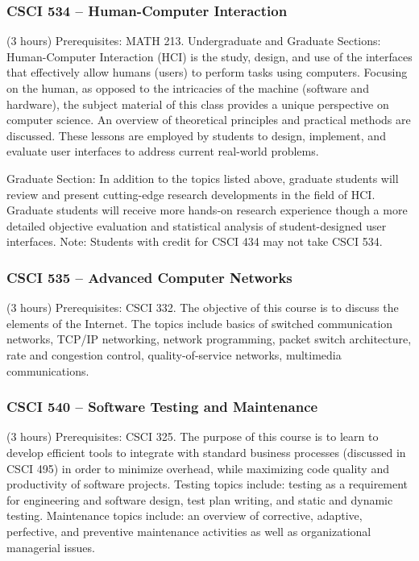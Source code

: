 \subsubsection{CSCI 534 -- Human-Computer Interaction}%
\label{course:CSCI:534}
(3 hours) Prerequisites: MATH 213. Undergraduate and Graduate Sections: Human-Computer Interaction (HCI) is the study, design, and use of the interfaces that effectively allow humans (users) to perform tasks using computers. Focusing on the human, as opposed to the intricacies of the machine (software and hardware), the subject material of this class provides a unique perspective on computer science. An overview of theoretical principles and practical methods are discussed. These lessons are employed by students to design, implement, and evaluate user interfaces to address current real-world problems.

Graduate Section: In addition to the topics listed above, graduate students will review and present cutting-edge research developments in the field of HCI. Graduate students will receive more hands-on research experience though a more detailed objective evaluation and statistical analysis of student-designed user interfaces. Note: Students with credit for CSCI 434 may not take CSCI 534.

\subsubsection{CSCI 535 -- Advanced Computer Networks}%
\label{course:CSCI:535}
(3 hours) Prerequisites:  CSCI 332. The objective of this course is to discuss the elements of the Internet. The topics include basics of switched communication networks, TCP/IP networking, network programming, packet switch architecture, rate and congestion control, quality-of-service networks, multimedia communications. 

\subsubsection{CSCI 540 -- Software Testing and Maintenance}%
\label{course:CSCI:540}
(3 hours) Prerequisites:  CSCI 325. The purpose of this course is to learn to develop efficient tools to integrate with standard business processes (discussed in CSCI 495) in order to minimize overhead, while maximizing code quality and productivity of software projects.  Testing topics include: testing as a requirement for engineering and software design, test plan writing, and static and dynamic testing. Maintenance topics include: an overview of corrective, adaptive, perfective, and preventive maintenance activities as well as organizational managerial issues. 

